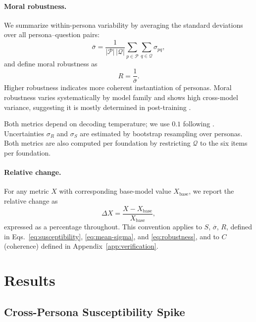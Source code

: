 \documentclass{article}
\begin{document}
\paragraph{Moral robustness.} We summarize within-persona variability by averaging the standard deviations over all persona--question pairs:
\begin{equation}
  \bar{\sigma} = \frac{1}{|\mathcal{P}|\,|\mathcal{Q}|} \sum_{p \in \mathcal{P}} \sum_{q \in \mathcal{Q}} \sigma_{pq},
  \label{eq:mean-sigma}
\end{equation}
and define moral robustness as
\begin{equation}
  R = \frac{1}{\bar{\sigma}}.
  \label{eq:robustness}
\end{equation}
Higher robustness indicates more coherent instantiation of personas. Moral robustness varies systematically by model family and shows high cross-model variance, suggesting it is mostly determined in post-training \citep{costa2025moral}.

Both metrics depend on decoding temperature; we use $0.1$ following \cite{costa2025moral}. Uncertainties $\sigma_R$ and $\sigma_S$ are estimated by bootstrap resampling over personas. Both metrics are also computed per foundation by restricting $\mathcal{Q}$ to the six items per foundation.

\paragraph{Relative change.} For any metric $X$ with corresponding base-model value $X_{\text{base}}$, we report the relative change as
\begin{equation}
  \Delta X = \frac{X - X_{\text{base}}}{X_{\text{base}}},
  \label{eq:delta}
\end{equation}
expressed as a percentage throughout. This convention applies to $S$, $\overline{\sigma}$, $R$, defined in Eqs.~\eqref{eq:susceptibility}, \eqref{eq:mean-sigma}, and \eqref{eq:robustness}, and to $C$ (coherence) defined in Appendix~\ref{app:verification}.


\section{Results}

\subsection{Cross-Persona Susceptibility Spike}
\label{sec:susceptibility}
\end{document}
